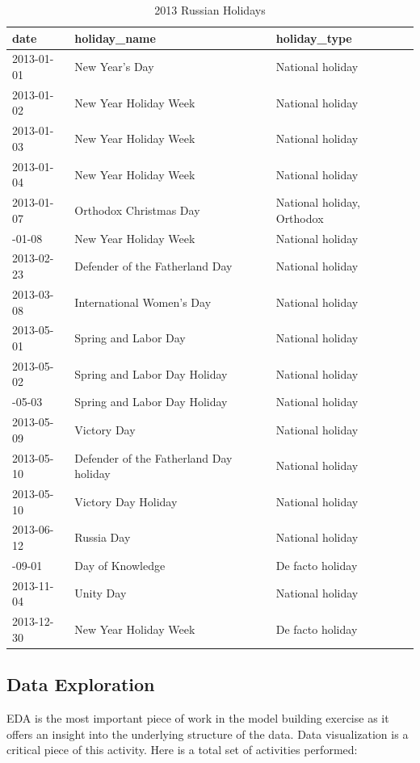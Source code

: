 \documentclass[floatsintext,man]{apa6}
\theoremstyle{definition}
\theoremstyle{definition}
\theoremstyle{definition}
\theoremstyle{remark}
\begin{document}
\begin{table}[H]

\caption{\label{tab:unnamed-chunk-4}2013 Russian Holidays}
\centering
\fontsize{9}{11}\selectfont
\begin{tabular}[t]{lll}
\toprule
date & holiday\_name & holiday\_type\\
\midrule
2013-01-01 & New Year's Day & National holiday\\
2013-01-02 & New Year Holiday Week & National holiday\\
2013-01-03 & New Year Holiday Week & National holiday\\
2013-01-04 & New Year Holiday Week & National holiday\\
2013-01-07 & Orthodox Christmas Day & National holiday, Orthodox\\
\addlinespace
2013-01-08 & New Year Holiday Week & National holiday\\
2013-02-23 & Defender of the Fatherland Day & National holiday\\
2013-03-08 & International Women's Day & National holiday\\
2013-05-01 & Spring and Labor Day & National holiday\\
2013-05-02 & Spring and Labor Day Holiday & National holiday\\
\addlinespace
2013-05-03 & Spring and Labor Day Holiday & National holiday\\
2013-05-09 & Victory Day & National holiday\\
2013-05-10 & Defender of the Fatherland Day holiday & National holiday\\
2013-05-10 & Victory Day Holiday & National holiday\\
2013-06-12 & Russia Day & National holiday\\
\addlinespace
2013-09-01 & Day of Knowledge & De facto holiday\\
2013-11-04 & Unity Day & National holiday\\
2013-12-30 & New Year Holiday Week & De facto holiday\\
\bottomrule
\end{tabular}
\end{table}

\subsection{Data Exploration}\label{data-exploration}

EDA is the most important piece of work in the model building exercise
as it offers an insight into the underlying structure of the data. Data
visualization is a critical piece of this activity. Here is a total set
of activities performed:
\end{document}
